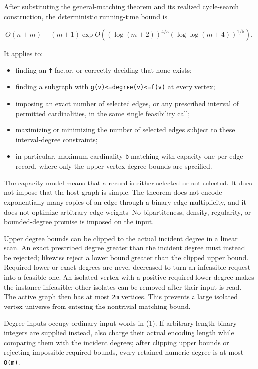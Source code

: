 After substituting the general-matching theorem and its realized cycle-search construction, the deterministic running-time bound is

\[
O(n+m)+(m+1)\exp O\!\left(
 (\log(m+2))^{4/5}(\log\log(m+4))^{1/5}\right) .          \tag{1}
\]

It applies to:

\begin{itemize}
\tightlist
\item
  finding an \texttt{f}-factor, or correctly deciding that none exists;
\item
  finding a subgraph with \texttt{g(v)\textless{}=degree(v)\textless{}=f(v)} at every vertex;
\item
  imposing an exact number of selected edges, or any prescribed interval of permitted cardinalities, in the same single feasibility call;
\item
  maximizing or minimizing the number of selected edges subject to these interval-degree constraints;
\item
  in particular, maximum-cardinality \texttt{b}-matching with capacity one per edge record, where only the upper vertex-degree bounds are specified.
\end{itemize}

The capacity model means that a record is either selected or not selected. It does not impose that the host graph is simple. The theorem does not encode exponentially many copies of an edge through a binary edge multiplicity, and it does not optimize arbitrary edge weights. No bipartiteness, density, regularity, or bounded-degree promise is imposed on the input.

Upper degree bounds can be clipped to the actual incident degree in a linear scan. An exact prescribed degree greater than the incident degree must instead be rejected; likewise reject a lower bound greater than the clipped upper bound. Required lower or exact degrees are never decreased to turn an infeasible request into a feasible one. An isolated vertex with a positive required lower degree makes the instance infeasible; other isolates can be removed after their input is read. The active graph then has at most \texttt{2m} vertices. This prevents a large isolated vertex universe from entering the nontrivial matching bound.

Degree inputs occupy ordinary input words in (1). If arbitrary-length binary integers are supplied instead, also charge their actual encoding length while comparing them with the incident degrees; after clipping upper bounds or rejecting impossible required bounds, every retained numeric degree is at most \texttt{O(m)}.

